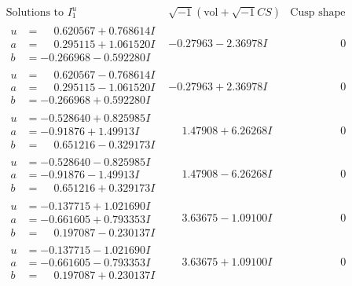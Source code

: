 \documentclass[1p]{elsarticle_modified}
\theoremstyle{definition}
\newcommand{\I}{\sqrt{-1}}
\begin{document}
$$\begin{array}{c|c|c}  
\text{Solutions to }I^u_{1}& \I (\text{vol} + \sqrt{-1}CS) & \text{Cusp shape}\\
 \hline 
\begin{aligned}
u &= \phantom{-}0.620567 + 0.768614 I \\
a &= \phantom{-}0.295115 + 1.061520 I \\
b &= -0.266968 - 0.592280 I\end{aligned}
 & -0.27963 - 2.36978 I & \phantom{-0.000000 } 0 \\ \hline\begin{aligned}
u &= \phantom{-}0.620567 - 0.768614 I \\
a &= \phantom{-}0.295115 - 1.061520 I \\
b &= -0.266968 + 0.592280 I\end{aligned}
 & -0.27963 + 2.36978 I & \phantom{-0.000000 } 0 \\ \hline\begin{aligned}
u &= -0.528640 + 0.825985 I \\
a &= -0.91876 + 1.49913 I \\
b &= \phantom{-}0.651216 - 0.329173 I\end{aligned}
 & \phantom{-}1.47908 + 6.26268 I & \phantom{-0.000000 } 0 \\ \hline\begin{aligned}
u &= -0.528640 - 0.825985 I \\
a &= -0.91876 - 1.49913 I \\
b &= \phantom{-}0.651216 + 0.329173 I\end{aligned}
 & \phantom{-}1.47908 - 6.26268 I & \phantom{-0.000000 } 0 \\ \hline\begin{aligned}
u &= -0.137715 + 1.021690 I \\
a &= -0.661605 + 0.793353 I \\
b &= \phantom{-}0.197087 - 0.230137 I\end{aligned}
 & \phantom{-}3.63675 - 1.09100 I & \phantom{-0.000000 } 0 \\ \hline\begin{aligned}
u &= -0.137715 - 1.021690 I \\
a &= -0.661605 - 0.793353 I \\
b &= \phantom{-}0.197087 + 0.230137 I\end{aligned}
 & \phantom{-}3.63675 + 1.09100 I & \phantom{-0.000000 } 0 \\ \hline\begin{aligned}

\end{aligned}
\end{array}$$
\end{document}
